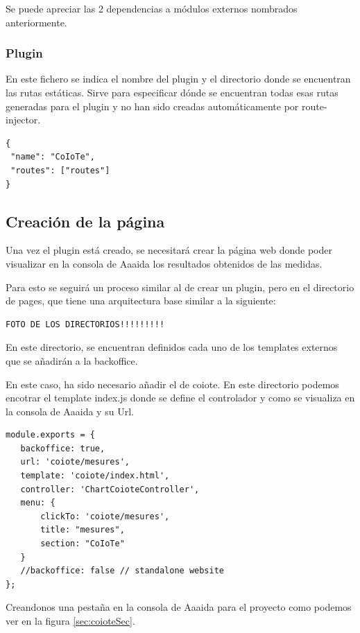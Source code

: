 Se puede apreciar las 2 dependencias a módulos externos nombrados anteriormente. 

\subsubsection{Plugin} 

En este fichero se indica el nombre del plugin y el directorio donde se encuentran
las rutas estáticas. Sirve para especificar dónde se encuentran todas esas rutas generadas para el plugin y no han sido creadas automáticamente por route-injector. 

\begin{verbatim}
{
 "name": "CoIoTe",
 "routes": ["routes"]
}
\end{verbatim}

\subsection{Creación de la página}

Una vez el plugin está creado, se necesitará crear la página web donde poder visualizar en la consola de Aaaida los resultados obtenidos de las medidas. 

Para esto se seguirá un proceso similar al de crear un plugin, pero en el directorio de pages, que tiene una arquitectura base similar a la siguiente:  

\begin{verbatim}
FOTO DE LOS DIRECTORIOS!!!!!!!!!
\end{verbatim}

En este directorio, se encuentran definidos cada uno de los templates externos que se añadirán a la backoffice.

En este caso, ha sido necesario añadir el de coiote. En este directorio podemos encotrar el template index.js donde se define el controlador y como se visualiza en la consola de Aaaida y su Url. 

\begin{verbatim}
module.exports = {
   backoffice: true,
   url: 'coiote/mesures',
   template: 'coiote/index.html',
   controller: 'ChartCoioteController',
   menu: {
       clickTo: 'coiote/mesures',
       title: "mesures",
       section: "CoIoTe"
   }
   //backoffice: false // standalone website
};
\end{verbatim}

Creandonos una pestaña en la consola de Aaaida para el proyecto como podemos ver en la figura \ref{sec:coioteSec}. 

